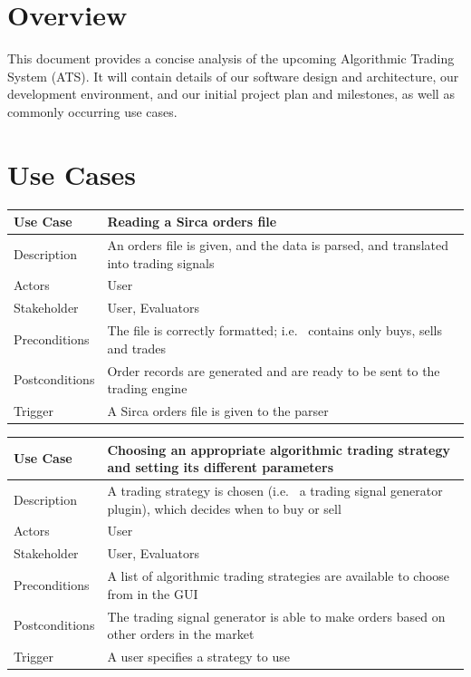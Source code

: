 \documentclass{article}
\begin{document}
\maketitle


\section{Overview}
This document provides a concise analysis of the upcoming Algorithmic Trading System (ATS). It will contain details of our software design and architecture, our development environment, and our initial project plan and milestones, as well as commonly occurring use cases.


\section{Use Cases}

\begin{tabular}{|p{1in}|p{3in}|}
\hline
Use Case & Reading a Sirca orders file\\\hline
Description & An orders file is given, and the data is parsed, and translated into trading signals\\
Actors & User\\
Stakeholder & User, Evaluators\\
Preconditions & The file is correctly formatted; i.e. \ contains only buys, sells and trades\\
Postconditions & Order records are generated and are ready to be sent to the trading engine\\
Trigger & A Sirca orders file is given to the parser\\
\hline
\end{tabular}

\begin{tabular}{|p{1in}|p{3in}|}
\hline
Use Case & Choosing an appropriate algorithmic trading strategy and setting its different parameters\\\hline
Description & A trading strategy is chosen (i.e. \ a trading signal generator plugin), which decides when to buy or sell\\
Actors & User\\
Stakeholder & User, Evaluators\\
Preconditions & A list of algorithmic trading strategies are available to choose from in the GUI\\
Postconditions & The trading signal generator is able to make orders based on other orders in the market\\
Trigger & A user specifies a strategy to use\\
\hline
\end{tabular}
\end{document}
